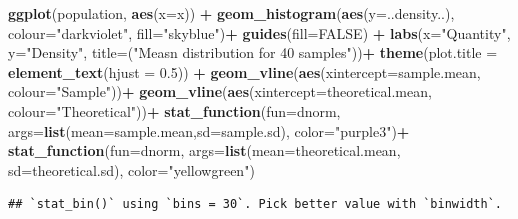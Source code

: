 \documentclass[
]{article}
\newenvironment{Shaded}{\begin{snugshade}}{\end{snugshade}}
\newcommand{\DataTypeTok}[1]{\textcolor[rgb]{0.13,0.29,0.53}{#1}}
\newcommand{\FloatTok}[1]{\textcolor[rgb]{0.00,0.00,0.81}{#1}}
\newcommand{\KeywordTok}[1]{\textcolor[rgb]{0.13,0.29,0.53}{\textbf{#1}}}
\newcommand{\NormalTok}[1]{#1}
\newcommand{\OperatorTok}[1]{\textcolor[rgb]{0.81,0.36,0.00}{\textbf{#1}}}
\newcommand{\OtherTok}[1]{\textcolor[rgb]{0.56,0.35,0.01}{#1}}
\newcommand{\StringTok}[1]{\textcolor[rgb]{0.31,0.60,0.02}{#1}}
\begin{document}
\begin{Shaded}
\begin{Highlighting}[]
\KeywordTok{ggplot}\NormalTok{(population, }\KeywordTok{aes}\NormalTok{(}\DataTypeTok{x=}\NormalTok{x)) }\OperatorTok{+}
\StringTok{  }\KeywordTok{geom_histogram}\NormalTok{(}\KeywordTok{aes}\NormalTok{(}\DataTypeTok{y=}\NormalTok{..density..), }\DataTypeTok{colour=}\StringTok{"darkviolet"}\NormalTok{, }\DataTypeTok{fill=}\StringTok{"skyblue"}\NormalTok{)}\OperatorTok{+}\StringTok{ }
\StringTok{  }\KeywordTok{guides}\NormalTok{(}\DataTypeTok{fill=}\OtherTok{FALSE}\NormalTok{) }\OperatorTok{+}
\StringTok{  }\KeywordTok{labs}\NormalTok{(}\DataTypeTok{x=}\StringTok{"Quantity"}\NormalTok{, }\DataTypeTok{y=}\StringTok{"Density"}\NormalTok{, }\DataTypeTok{title=}\NormalTok{(}\StringTok{"Measn distribution for 40 samples"}\NormalTok{))}\OperatorTok{+}
\StringTok{  }\KeywordTok{theme}\NormalTok{(}\DataTypeTok{plot.title =} \KeywordTok{element_text}\NormalTok{(}\DataTypeTok{hjust =} \FloatTok{0.5}\NormalTok{)) }\OperatorTok{+}
\StringTok{  }\KeywordTok{geom_vline}\NormalTok{(}\KeywordTok{aes}\NormalTok{(}\DataTypeTok{xintercept=}\NormalTok{sample.mean, }\DataTypeTok{colour=}\StringTok{"Sample"}\NormalTok{))}\OperatorTok{+}
\StringTok{  }\KeywordTok{geom_vline}\NormalTok{(}\KeywordTok{aes}\NormalTok{(}\DataTypeTok{xintercept=}\NormalTok{theoretical.mean, }\DataTypeTok{colour=}\StringTok{"Theoretical"}\NormalTok{))}\OperatorTok{+}
\StringTok{  }\KeywordTok{stat_function}\NormalTok{(}\DataTypeTok{fun=}\NormalTok{dnorm, }\DataTypeTok{args=}\KeywordTok{list}\NormalTok{(}\DataTypeTok{mean=}\NormalTok{sample.mean,}\DataTypeTok{sd=}\NormalTok{sample.sd), }\DataTypeTok{color=}\StringTok{"purple3"}\NormalTok{)}\OperatorTok{+}
\StringTok{  }\KeywordTok{stat_function}\NormalTok{(}\DataTypeTok{fun=}\NormalTok{dnorm, }\DataTypeTok{args=}\KeywordTok{list}\NormalTok{(}\DataTypeTok{mean=}\NormalTok{theoretical.mean, }\DataTypeTok{sd=}\NormalTok{theoretical.sd), }\DataTypeTok{color=}\StringTok{"yellowgreen"}\NormalTok{)}
\end{Highlighting}
\end{Shaded}

\begin{verbatim}
## `stat_bin()` using `bins = 30`. Pick better value with `binwidth`.
\end{verbatim}
\end{document}
